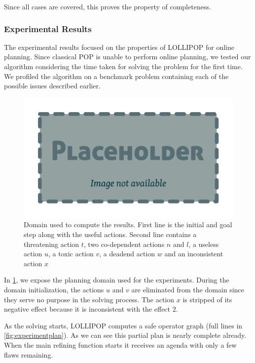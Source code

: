 \documentclass[11pt,a4paper,twoside,openright,titlepage,numbers=noenddot,headinclude,cleardoublepage=empty,openany]{scrreprt}
\theoremstyle{plain}
\theoremstyle{definition}
\theoremstyle{remark}
\begin{document}
Since all cases are covered, this proves the property of completeness.

\hypertarget{sec:results}{%
\subsubsection{Experimental Results}\label{sec:results}}

The experimental results focused on the properties of LOLLIPOP for
online planning. Since classical POP is unable to perform online
planning, we tested our algorithm considering the time taken for solving
the problem for the first time. We profiled the algorithm on a benchmark
problem containing each of the possible issues described earlier.

\begin{figure}
\hypertarget{fig:experiment}{%
\centering
\includegraphics{./tex2pdf.-0b80fea6fd6da7f9/85c5abcb21612ede4db12ac6fcfd32ed24ed57eb.pdf}
\caption{Domain used to compute the results. First line is the initial
and goal step along with the useful actions. Second line contains a
threatening action \(t\), two co-dependent actions \(n\) and \(l\), a
useless action \(u\), a toxic action \(v\), a deadend action \(w\) and
an inconsistent action \(x\)}\label{fig:experiment}
}
\end{figure}

In \cref{fig:experiment}, we expose the planning domain used for the
experiments. During the domain initialization, the actions \(u\) and
\(v\) are eliminated from the domain since they serve no purpose in the
solving process. The action \(x\) is stripped of its negative effect
because it is inconsistent with the effect \(2\).

As the solving starts, LOLLIPOP computes a safe operator graph (full
lines in \cref{fig:experimentplan}). As we can see this partial plan is
nearly complete already. When the main refining function starts it
receives an agenda with only a few flaws remaining.
\end{document}
